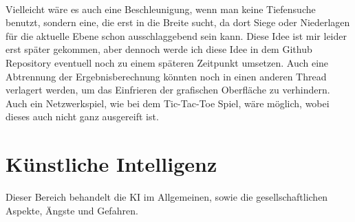 \documentclass[12pt,a4paper]{article}
\begin{document}
	\\\\\\\\\\\\Vielleicht wäre es auch eine Beschleunigung, wenn man keine Tiefensuche benutzt, sondern eine, die erst in die Breite sucht, da dort Siege oder Niederlagen für die aktuelle Ebene schon ausschlaggebend sein kann. Diese Idee ist mir leider erst später gekommen, aber dennoch werde ich diese Idee in dem Github Repository eventuell noch zu einem späteren Zeitpunkt umsetzen. Auch eine Abtrennung der Ergebnisberechnung könnten noch in einen anderen Thread verlagert werden, um das Einfrieren der grafischen Oberfläche zu verhindern. Auch ein Netzwerkspiel, wie bei dem Tic-Tac-Toe Spiel, wäre möglich, wobei dieses auch nicht ganz ausgereift ist.
	\section{Künstliche Intelligenz}
	Dieser Bereich behandelt die KI im Allgemeinen, sowie die gesellschaftlichen Aspekte, Ängste und Gefahren.
\end{document}
